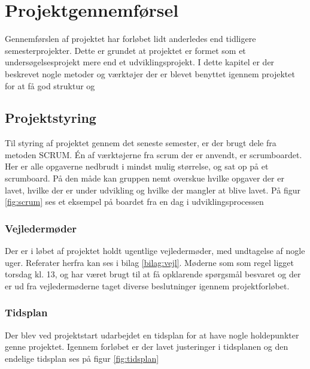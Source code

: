 \thispagestyle{fancy}
\chapter{Projektgennemførsel}
\label{chp:projektgennemforsel}

Gennemførslen af projektet har forløbet lidt anderledes end tidligere semesterprojekter. Dette er grundet at projektet er formet som et undersøgelsesprojekt mere end et udviklingsprojekt. I dette kapitel er der beskrevet nogle metoder og værktøjer der er blevet benyttet igennem projektet for at få god struktur og

\section{Projektstyring}
\label{sec:projektstyring}

Til styring af projektet gennem det seneste semester, er der brugt dele fra metoden SCRUM.
Én af værktøjerne fra scrum der er anvendt, er scrumboardet. Her er alle opgaverne nedbrudt i mindst mulig størrelse, og sat op på et scrumboard. På den måde kan gruppen nemt overskue hvilke opgaver der er lavet, hvilke der er under udvikling og hvilke der mangler at blive lavet. På figur \ref{fig:scrum} ses et eksempel på boardet fra en dag i udviklingsprocessen


\subsection{Vejledermøder}
Der er i løbet af projektet holdt ugentlige vejledermøder, med undtagelse af nogle uger. Referater herfra kan ses i bilag \ref{bilag:vejl}. Møderne som som regel ligget torsdag kl. 13, og har været brugt til at få opklarende spørgsmål besvaret og der er ud fra vejledermøderne taget diverse beslutninger igennem projektforløbet.

\subsection{Tidsplan}
\label{sec:tidsplan}
Der blev ved projektstart udarbejdet en tidsplan for at have nogle holdepunkter genne projektet. Igennem forløbet er der lavet justeringer i tidsplanen og den endelige tidsplan ses på figur \ref{fig:tidsplan}


